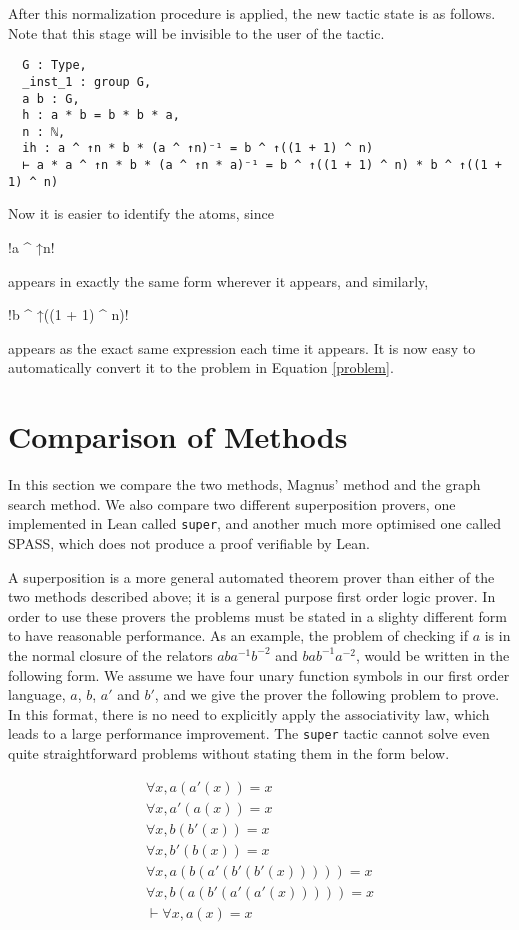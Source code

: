 \documentclass[12pt]{article} %
\theoremstyle{definition}
\theoremstyle{definition}
\theoremstyle{definition}
\theoremstyle{definition}
\theoremstyle{definition}
\theoremstyle{definition}
\begin{document}
After this normalization procedure is applied, the new tactic state is as follows.
Note that this stage will be invisible to the user of the tactic.

\begin{lstlisting}
  G : Type,
  _inst_1 : group G,
  a b : G,
  h : a * b = b * b * a,
  n : ℕ,
  ih : a ^ ↑n * b * (a ^ ↑n)⁻¹ = b ^ ↑((1 + 1) ^ n)
  ⊢ a * a ^ ↑n * b * (a ^ ↑n * a)⁻¹ = b ^ ↑((1 + 1) ^ n) * b ^ ↑((1 + 1) ^ n)
\end{lstlisting}

Now it is easier to identify the atoms, since \begin{lstinline} !a ^ ↑n! \end{lstinline}
appears in exactly the same form wherever it appears, and similarly, \begin{lstinline} !b ^ ↑((1 + 1) ^ n)!
\end{lstinline} appears as the exact same expression each time it appears. It is
now easy to automatically convert it to the problem in Equation \ref{problem}.
\section{Comparison of Methods}

In this section we compare the two methods,
Magnus' method and the graph search
method. We also compare two different superposition provers,
one implemented in Lean called \lstinline{super}, and another much more optimised
one called SPASS, which does not produce a proof verifiable by Lean.

A superposition is a more general automated theorem prover than either of the two methods
described above; it is a general purpose first order logic prover. In order to use these provers
the problems must be stated in a slighty different form to have reasonable performance.
As an example, the problem of checking if $a$ is in the normal closure of the
relators $aba^{-1}b^{-2}$ and $bab^{-1}a^{-2}$, would be written in the following form.
We assume we have four unary function symbols in our first order language,
$a$, $b$, $a'$ and $b'$, and we give the prover the following problem to prove. In
this format, there is no need to explicitly apply the associativity law, which
leads to a large performance improvement. The \lstinline{super} tactic cannot solve
even quite straightforward problems without stating them in the form below.

\begin{equation}
  \begin{aligned}
  \forall x, a (a' (x)) = x \\
  \forall x, a' (a (x)) = x \\
  \forall x, b (b' (x)) = x \\
  \forall x, b' (b (x)) = x \\
  \forall x, a(b(a'(b'(b'(x))))) = x \\
  \forall x, b(a(b'(a'(a'(x))))) = x \\
  \vdash \forall x, a(x) = x
  \end{aligned}
\end{equation}
\end{document}
